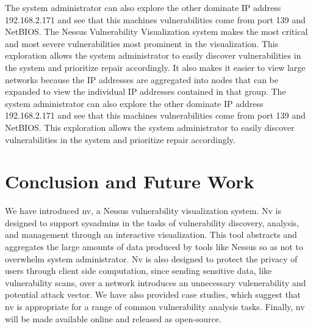 \documentclass{acm_proc_article-sp}
\begin{document}
The system administrator can also explore the other dominate IP address 192.168.2.171 and
see that this machines vulnerabilities come from port 139 and NetBIOS. The
Nessus Vulnerability Visualization system makes the most critical and most
severe vulnerabilities most prominent in the visualization. This
exploration allows the system administrator to easily discover vulnerabilities
in the system and prioritize repair accordingly. It also makes it easier to view large
networks because the IP addresses are aggregated into nodes that can be expanded to view
the individual IP addresses contained in that group. The system administrator can also explore the other dominate IP address 192.168.2.171 and
see that this machines vulnerabilities come from port 139 and NetBIOS. This
exploration allows the system administrator to easily discover vulnerabilities
in the system and prioritize repair accordingly. 



\section{Conclusion and Future Work}

We have introduced nv, a Nessus vulnerability visualization system.
Nv is designed to support sysadmins in the tasks of vulnerability discovery, analysis, and management through an interactive visualization.
This tool abstracts and aggregates the large amounts of data produced by tools like Nessus so as not to overwhelm system administrator.
Nv is also designed to protect the privacy of users through client side computation, since sending sensitive data, like vulnerability scans, over a network introduces an unnecessary vulenerability and potential attack vector.
We have also provided case studies, which suggest that nv is appropriate for a range of common vulnerability analysis tasks.
Finally, nv will be made available online and released as open-source.



\end{document}
